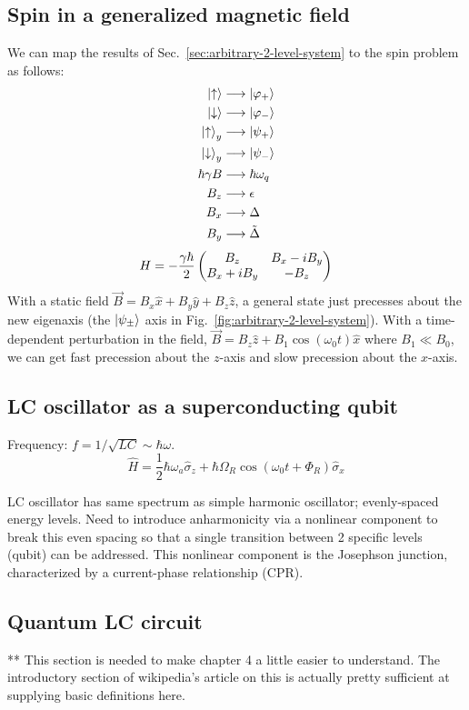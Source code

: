\documentclass[12pt]{article}
\begin{document}
\subsection{Spin in a generalized magnetic field}
We can map the results of Sec.~\ref{sec:arbitrary-2-level-system} to the spin
problem as follows:
\begin{alignat}{1}
    \ket{\uparrow} &\longrightarrow \ket{\varphi_+} \\
    \ket{\downarrow} &\longrightarrow \ket{\varphi_-} \\
    \ket{\uparrow}_y &\longrightarrow \ket{\psi_+} \\
    \ket{\downarrow}_y &\longrightarrow \ket{\psi_-} \\
    \hbar\gamma B &\longrightarrow \hbar\omega_q \\
    B_z &\longrightarrow \epsilon \\
    B_x &\longrightarrow \Delta \\
    B_y &\longrightarrow \tilde{\Delta} \\
\end{alignat}
\[H = -\frac{\gamma\hbar}{2}\pmqty{B_z & B_x - iB_y \\ B_x + iB_y& - B_z}\]
With a static field $\vec{B} = B_x\hat{x} + B_y\hat{y} + B_z\hat{z}$, a general
state just precesses about the new eigenaxis (the $\ket{\psi_\pm}$ axis in
Fig.~\ref{fig:arbitrary-2-level-system}). With a time-dependent perturbation in
the field, $\vec{B} = B_z\hat{z} + B_1\cos(\omega_0t)\hat{x}$ where $B_1 \ll
B_0$, we can get fast precession about the $z$-axis and slow precession about
the $x$-axis.


\subsection{LC oscillator as a superconducting qubit}
Frequency: $f = 1/\sqrt{LC} \sim \hbar\omega$.
\[\hat{H} = \frac{1}{2} \hbar\omega_a\hat{\sigma}_z +
\hbar\Omega_R\cos(\omega_0t+\Phi_R)\hat{\sigma}_x\]

LC oscillator has same spectrum as simple harmonic oscillator; evenly-spaced
energy levels. Need to introduce anharmonicity via a nonlinear component to
break this even spacing so that a single transition between 2 specific levels
(qubit) can be addressed. This nonlinear component is the Josephson junction,
characterized by a current-phase relationship (CPR).

\subsection{Quantum LC circuit}
** This section is needed to make chapter 4 a little easier to understand. The introductory section of wikipedia's article on this is actually pretty sufficient at supplying basic definitions here.
\end{document}
